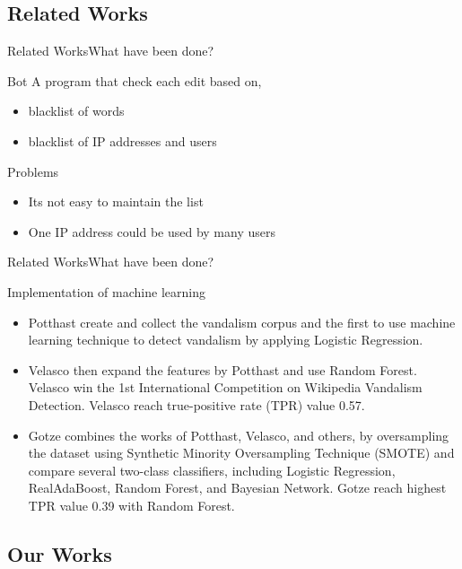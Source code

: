 \documentclass{beamer}
\begin{document}
\subsection{Related Works}

\begin{frame}{Related Works}{What have been done?}
	\begin{block}{Bot}
		A program that check each edit based on,
		\begin{itemize}
		\item blacklist of words
		\item blacklist of IP addresses and users
		\end{itemize}
	\end{block}
	\pause
	\begin{alertblock}{Problems}
		\begin{itemize}
		\item Its not easy to maintain the list
		\item One IP address could be used by many users
		\end{itemize}
	\end{alertblock}
\end{frame}

\begin{frame}{Related Works}{What have been done?}
	\begin{block}{Implementation of machine learning}
		\begin{itemize}
		\item Potthast create and collect the vandalism corpus and the first to
		use machine learning technique to detect vandalism by applying Logistic
		Regression.
		\item Velasco then expand the features by Potthast and use Random
		Forest. Velasco win the 1st International Competition on Wikipedia
		Vandalism Detection. Velasco reach true-positive rate (TPR) value 0.57.
		\item Gotze combines the works of Potthast, Velasco, and others,
		by oversampling the dataset using Synthetic Minority Oversampling
		Technique (SMOTE) and compare several two-class classifiers, including
		Logistic Regression, RealAdaBoost, Random Forest, and Bayesian Network.
		Gotze reach highest TPR value 0.39 with Random Forest.
		\end{itemize}
	\end{block}
\end{frame}

\subsection{Our Works}
\end{document}
